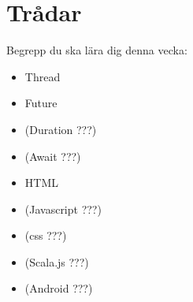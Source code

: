 \chapter{Trådar}\label{chapter:W12}
Begrepp du ska lära dig denna vecka:
\begin{multicols}{2}\begin{itemize}[nosep,label={$\square$},leftmargin=*]
\item Thread
\item Future
\item (Duration ???)
\item (Await ???)
\item HTML
\item (Javascript ???)
\item (css ???)
\item (Scala.js ???)
\item (Android ???)\end{itemize}\end{multicols}
